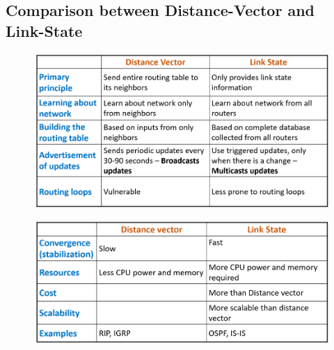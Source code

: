 \documentclass[a4paper]{article}
\theoremstyle{plain}
\theoremstyle{definition}
\begin{document}
\subsection{Comparison between Distance-Vector and Link-State}
\begin{figure}[!h]
    \centering
    \includegraphics[scale=0.7]{cn16.png}
    \label{fig:my_label_16}
\end{figure}

\begin{figure}[!h]
    \centering
    \includegraphics[scale=0.7]{cn17.png}
    \label{fig:my_label_17}
\end{figure}
\end{document}
